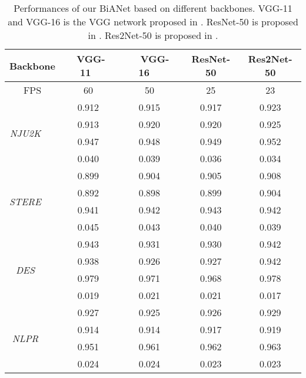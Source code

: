 \documentclass[journal]{IEEEtran}
\newcommand{\NJU}{\textit{NJU2K}~\cite{ju2014depth}}
\newcommand{\NLPR}{\textit{NLPR}~\cite{peng2014rgbd}}
\newcommand{\STERE}{\textit{STERE}~\cite{niu2012leveraging}}
\newcommand{\DES}{\textit{DES}~\cite{cheng2014depth}}
\begin{document}
\begin{table}[t]
	\centering
	\small
\renewcommand{\arraystretch}{1.25}
	\renewcommand{\tabcolsep}{0.7mm}
    \caption{Performances of our BiANet based on different backbones. VGG-11 and VGG-16 is the VGG network proposed in \cite{simonyan2015vgg}.
    ResNet-50 is proposed in \cite{he2016deep}.
    Res2Net-50 is proposed in \cite{gao2019res2net}.
	}
	\begin{tabular}{cc|cccc}
		\hline\toprule
		\multicolumn{2}{c|}{Backbone} & ~VGG-11~ & ~~VGG-16~~ & ResNet-50 & Res2Net-50 \\
		\hline
		\multicolumn{2}{c|}{FPS}  & 60 & 50 & 25 & 23   \\
		\hline
		\multirow{4}{*}{\begin{sideways}\NJU\end{sideways}}
		&     & 0.912 & 0.915 & 0.917 & 0.923   \\
		&      & 0.913 & 0.920 & 0.920 & 0.925   \\
		&        & 0.947 & 0.948 & 0.949 & 0.952   \\
		&  & 0.040 & 0.039 & 0.036 & 0.034   \\
		\hline
		\multirow{4}{*}{\begin{sideways}\STERE\end{sideways}}
		&     & 0.899 & 0.904 & 0.905 & 0.908   \\
		&      & 0.892 & 0.898 & 0.899 & 0.904   \\
		&        & 0.941 & 0.942 & 0.943 & 0.942   \\
		&  & 0.045 & 0.043 & 0.040 & 0.039   \\
		\hline
		\multirow{4}{*}{\begin{sideways}\DES\end{sideways}}
		&     & 0.943 & 0.931 & 0.930 & 0.942  \\
		&      & 0.938 & 0.926 & 0.927 & 0.942  \\
		&        & 0.979 & 0.971 & 0.968 & 0.978  \\
		&  & 0.019 & 0.021 & 0.021 & 0.017  \\
		\hline
		\multirow{4}{*}{\begin{sideways}\NLPR\end{sideways}}
		&     & 0.927 & 0.925 & 0.926 & 0.929  \\
		&      & 0.914 & 0.914 & 0.917 & 0.919  \\
		&        & 0.951 & 0.961 & 0.962 & 0.963  \\
		&  & 0.024 & 0.024 & 0.023 & 0.023  \\

\end{tabular}
\end{table}
\end{document}
